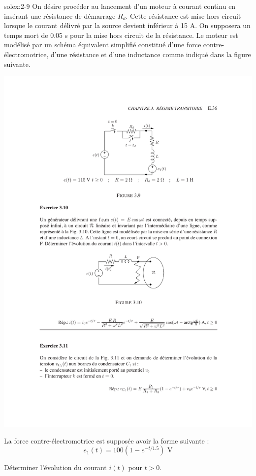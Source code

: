 \begin{exwithsol}{}{solex:2-9}
\label{ex:2-9}
On d\'esire proc\'eder au lancement d'un moteur \`a courant
continu en ins\'erant une r\'esistance de d\'emarrage $R_d$. Cette
r\'esistance est mise hors-circuit lorsque le courant d\'elivr\'e par la
source devient inf\'erieur \`a 15 A. On supposera un temps mort de 0.05 s
pour la mise hors circuit de la r\'esistance. Le moteur est mod\'elis\'e par
un sch\'ema \'equivalent simplifi\'e constitu\'e d'une force
contre-\'electromotrice, d'une r\'esistance et d'une  inductance comme
indiqu\'e dans la figure suivante.
\begin{center}
	\includegraphics[width=0.9\linewidth]{exercices/ex-3-9}
\end{center}
La force contre-\'electromotrice est suppos\'ee avoir la forme suivante :
\[e_1(t)=100(1-e^{-t/1.5})\,\, \mbox{V}\]

D\'eterminer l'\'evolution du courant $i(t)$ pour $t>0$.

\end{exwithsol}

